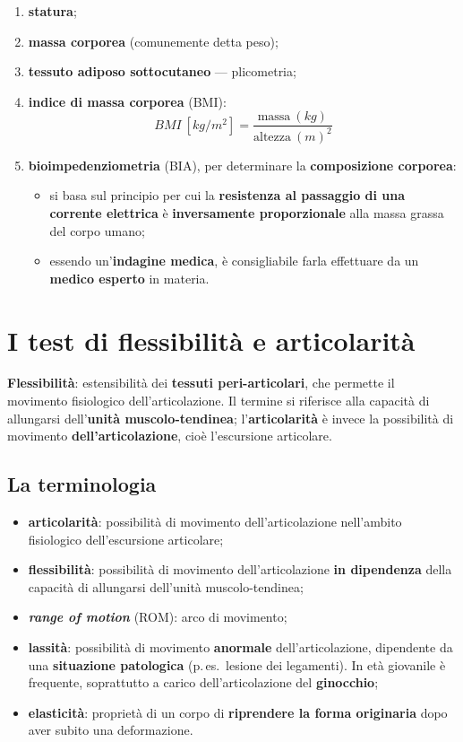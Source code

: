 \begin{enumerate}
  \item \textbf{statura};
  \item \textbf{massa corporea} (comunemente detta peso);
  \item \textbf{tessuto adiposo sottocutaneo} --- plicometria;
  \item \textbf{indice di massa corporea} (BMI):
    \[
      BMI\ [kg/m^2] = \frac{\textrm{massa}\ (kg)}{\textrm{altezza}\ (m)^2}
    \]
  \item \textbf{bioimpedenziometria} (BIA), per determinare la \textbf{composizione corporea}:
    \begin{itemize}
      \item si basa sul principio per cui la \textbf{resistenza al passaggio di una corrente
        elettrica} è \textbf{inversamente proporzionale} alla massa grassa del corpo umano;
      \item essendo un'\textbf{indagine medica}, è consigliabile farla effettuare da un
        \textbf{medico esperto} in materia.
    \end{itemize}
\end{enumerate}

\section{I test di flessibilità e articolarità}

\textbf{Flessibilità}: estensibilità dei \textbf{tessuti peri-articolari}, che permette il movimento
fisiologico dell'articolazione. Il termine si riferisce alla capacità di allungarsi dell'\textbf{unità
muscolo-tendinea}; l'\textbf{articolarità} è invece la possibilità di movimento
\textbf{dell'articolazione}, cioè l'escursione articolare.

\subsection{La terminologia}

\begin{itemize}
  \item \textbf{articolarità}: possibilità di movimento dell'articolazione nell'ambito fisiologico
    dell'escursione articolare;
  \item \textbf{flessibilità}: possibilità di movimento dell'articolazione \textbf{in dipendenza}
    della capacità di allungarsi dell'unità muscolo-tendinea;
  \item \textbf{\textit{range of motion}} (ROM): arco di movimento;
  \item \textbf{lassità}: possibilità di movimento \textbf{anormale} dell'articolazione, dipendente
    da una \textbf{situazione patologica} (p.\,es.\ lesione dei legamenti). In età giovanile è
    frequente, soprattutto a carico dell'articolazione del \textbf{ginocchio};
  \item \textbf{elasticità}: proprietà di un corpo di \textbf{riprendere la forma originaria} dopo
    aver subito una deformazione.
\end{itemize}

